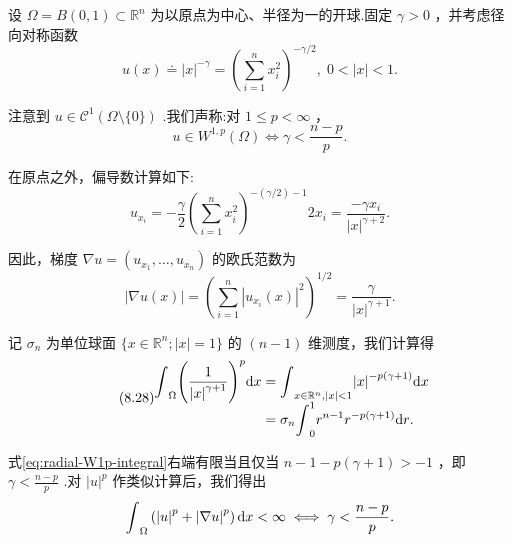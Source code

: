 \begin{instance}\label{ins:radial-singularity-W1p}
设 $\Omega  = B\left( {0,1}\right)  \subset  {\mathbb{R}}^{n}$ 为以原点为中心、半径为一的开球.固定 $\gamma  > 0$ ，并考虑径向对称函数
\[
u\left( x\right)  \doteq  {\left| x\right| }^{-\gamma } = {\left( \sum_{{i = 1}}^{n}{x}_{i}^{2}\right) }^{-\gamma /2},\;0 < \left| x\right|  < 1.
\]

注意到 $u \in  {\mathcal{C}}^{1}\left( {\Omega \setminus \{ 0\} }\right)$ .我们声称:对 $1 \leq  p < \infty$ ，
\begin{equation}\tag{8.26}\label{eq:radial-W1p-condition}
u \in  {W}^{1,p}\left( \Omega \right)\iff \gamma  < \frac{n - p}{p}.
\end{equation}

在原点之外，偏导数计算如下:
\begin{equation}\tag{8.27}\label{eq:radial-W1p-derivative}
{u}_{{x}_{i}} =  - \frac{\gamma }{2}{\left( \sum_{{i = 1}}^{n}{x}_{i}^{2}\right) }^{-\left( {\gamma /2}\right)  - 1}2{x}_{i} = \frac{-\gamma {x}_{i}}{{\left| x\right| }^{\gamma  + 2}}.
\end{equation}

因此，梯度 $\nabla u = \left( {{u}_{{x}_{1}},\ldots ,{u}_{{x}_{n}}}\right)$ 的欧氏范数为
\[
\left| {\nabla u\left( x\right) }\right|  = {\left( \sum_{{i = 1}}^{n}{\left| {u}_{{x}_{i}}\left( x\right) \right| }^{2}\right) }^{1/2} = \frac{\gamma }{{\left| x\right| }^{\gamma  + 1}}.
\]

记 ${\sigma }_{n}$ 为单位球面 $\{ x \in  {\mathbb{R}}^{n};\left| x\right|  = 1\}$ 的 $\left( {n - 1}\right)$ 维测度，我们计算得
\begin{equation}\tag{8.28}\label{eq:radial-W1p-integral}
    \setjot[-2]\begin{aligned}
        {\int }_{\Omega }{\left( \frac{1}{{\left| x\right| }^{\gamma  + 1}}\right) }^{p}{\d x} &= {\int }_{x \in  {\mathbb{R}}^{n},\left| x\right|  < 1}{\left| x\right| }^{-p\left( {\gamma  + 1}\right) }{\d x}\\
        &= {\sigma }_{n}{\int }_{0}^{1}{r}^{n - 1}{r}^{-p\left( {\gamma  + 1}\right) }{\d r}.
    \end{aligned}
\end{equation}

式\eqref{eq:radial-W1p-integral}右端有限当且仅当 $n - 1 - p\left( {\gamma  + 1}\right)  >  - 1$ ，即 $\gamma  < \frac{n - p}{p}$ .对 ${\left| u\right| }^{p}$ 作类似计算后，我们得出
\[
{\int }_{\Omega }\left( {{\left| u\right| }^{p} + {\left| \nabla u\right| }^{p}}\right) {\mathop{}\!\mathrm{d} x} < \infty \iff \gamma  < \frac{n - p}{p}.
\]


\end{instance}
